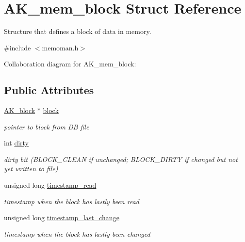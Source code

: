 \hypertarget{structAK__mem__block}{}\section{A\+K\+\_\+mem\+\_\+block Struct Reference}
\label{structAK__mem__block}


Structure that defines a block of data in memory.  




{\ttfamily \#include $<$memoman.\+h$>$}



Collaboration diagram for A\+K\+\_\+mem\+\_\+block\+:
\subsection*{Public Attributes}
\begin{DoxyCompactItemize}
\item 
\hyperlink{structAK__block}{A\+K\+\_\+block} $\ast$ \hyperlink{structAK__mem__block_afe6bab88220d9357348e69f812d024b4}{block}\hypertarget{structAK__mem__block_afe6bab88220d9357348e69f812d024b4}{}\label{structAK__mem__block_afe6bab88220d9357348e69f812d024b4}

\begin{DoxyCompactList}\small\item\em pointer to block from DB file \end{DoxyCompactList}\item 
int \hyperlink{structAK__mem__block_a9d5dce682d27f9916b9e42d7ca159e68}{dirty}\hypertarget{structAK__mem__block_a9d5dce682d27f9916b9e42d7ca159e68}{}\label{structAK__mem__block_a9d5dce682d27f9916b9e42d7ca159e68}

\begin{DoxyCompactList}\small\item\em dirty bit (B\+L\+O\+C\+K\+\_\+\+C\+L\+E\+AN if unchanged; B\+L\+O\+C\+K\+\_\+\+D\+I\+R\+TY if changed but not yet written to file) \end{DoxyCompactList}\item 
unsigned long \hyperlink{structAK__mem__block_a2ad2ddb6c30f91bdff3af10886ab9e7a}{timestamp\+\_\+read}\hypertarget{structAK__mem__block_a2ad2ddb6c30f91bdff3af10886ab9e7a}{}\label{structAK__mem__block_a2ad2ddb6c30f91bdff3af10886ab9e7a}

\begin{DoxyCompactList}\small\item\em timestamp when the block has lastly been read \end{DoxyCompactList}\item 
unsigned long \hyperlink{structAK__mem__block_ad575095cfe45be3ed7f466c4239d6bda}{timestamp\+\_\+last\+\_\+change}\hypertarget{structAK__mem__block_ad575095cfe45be3ed7f466c4239d6bda}{}\label{structAK__mem__block_ad575095cfe45be3ed7f466c4239d6bda}

\begin{DoxyCompactList}\small\item\em timestamp when the block has lastly been changed \end{DoxyCompactList}\end{DoxyCompactItemize}


